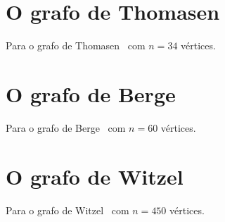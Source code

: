 \section{O grafo de Thomasen}
Para o grafo de Thomasen~\cite{cite:example-thomasen} com $n=34$
vértices.

\section{O grafo de Berge}
Para o grafo de Berge~\cite{cite:example-berge} com $n=60$ vértices.

\section{O grafo de Witzel}
Para o grafo de Witzel~\cite{cite:example-witzel} com $n=450$
vértices.


